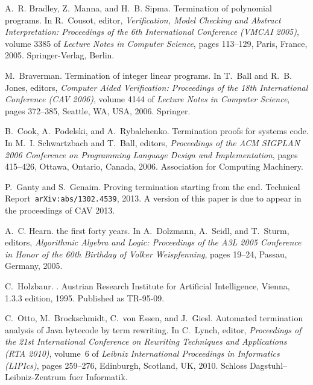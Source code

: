 \documentclass{acm_proc_article-sp}
\begin{document}
\begin{thebibliography}{10}
A.~R. Bradley, Z.~Manna, and H.~B. Sipma.
\newblock Termination of polynomial programs.
\newblock In R.~Cousot, editor, {\em Verification, Model Checking and Abstract
  Interpretation: Proceedings of the 6th International Conference (VMCAI
  2005)}, volume 3385 of {\em Lecture Notes in Computer Science}, pages
  113--129, Paris, France, 2005. Springer-Verlag, Berlin.

M.~Braverman.
\newblock Termination of integer linear programs.
\newblock In T.~Ball and R.~B. Jones, editors, {\em Computer Aided
  Verification: Proceedings of the 18th International Conference (CAV 2006)},
  volume 4144 of {\em Lecture Notes in Computer Science}, pages 372--385,
  Seattle, WA, USA, 2006. Springer.

B.~Cook, A.~Podelski, and A.~Rybalchenko.
\newblock Termination proofs for systems code.
\newblock In M.~I. Schwartzbach and T.~Ball, editors, {\em Proceedings of the
  ACM SIGPLAN 2006 Conference on Programming Language Design and
  Implementation}, pages 415--426, Ottawa, Ontario, Canada, 2006. Association
  for Computing Machinery.

P.~Ganty and S.~Genaim.
\newblock Proving termination starting from the end.
\newblock Technical Report~{\tt arXiv:abs/1302.4539}, 2013.
\newblock A version of this paper is due to appear in the proceedings of CAV
  2013.

A.~C. Hearn.
 the first forty years.
\newblock In A.~Dolzmann, A.~Seidl, and T.~Sturm, editors, {\em Algorithmic
  Algebra and Logic: Proceedings of the A3L 2005 Conference in Honor of the
  60th Birthday of Volker Weispfenning}, pages 19--24, Passau, Germany, 2005.

C.~Holzbaur.
.
\newblock Austrian Research Institute for Artificial Intelligence, Vienna,
  1.3.3 edition, 1995.
\newblock Published as TR-95-09.

C.~Otto, M.~Brockschmidt, C.~{von Essen}, and J.~Giesl.
\newblock Automated termination analysis of {Java} bytecode by term rewriting.
\newblock In C.~Lynch, editor, {\em Proceedings of the 21st International
  Conference on Rewriting Techniques and Applications (RTA 2010)}, volume~6 of
  {\em Leibniz International Proceedings in Informatics (LIPIcs)}, pages
  259--276, Edinburgh, Scotland, UK, 2010. Schloss Dagstuhl--Leibniz-Zentrum
  fuer Informatik.


\end{thebibliography}
\end{document}
